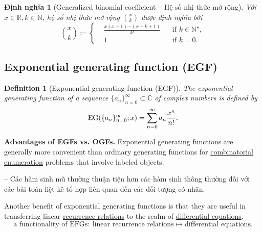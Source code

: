 \documentclass[oneside]{book}
\newtheorem{definition}{Definition}
\newtheorem{dinhnghia}{Định nghĩa}
\begin{document}
\begin{dinhnghia}[Generalized binomial coefficient -- Hệ số nhị thức mở rộng]
	Với $x\in\mathbb{R},k\in\mathbb{N}$, {\rm hệ số nhị thức mở rộng} $\binom{x}{k}$ được định nghĩa bởi
	\begin{equation*}
		\binom{x}{k}\coloneqq\left\{\begin{split}
			&\frac{x(x - 1)\cdots(x - k + 1)}{k!}&&\mbox{if } k\in\mathbb{N}^\star,\\
			&1&&\mbox{if } k = 0.
		\end{split}\right.
	\end{equation*}	
\end{dinhnghia}


\subsection{Exponential generating function (EGF)}

\begin{definition}[Exponential generating function (EGF)]
	The {\rm exponential generating function} of a sequence $\{a_n\}_{n=0}^\infty\subset\mathbb{C}$ of complex numbers is defined by
	\begin{equation*}
		{\rm EG}(\{a_n\}_{n=0}^\infty;x) = \sum_{n=0}^\infty a_n\frac{x^n}{n!}.
	\end{equation*}	
\end{definition}
\noindent\textsf{{\bf Advantages of EGFs vs. OGFs.}} Exponential generating functions are generally more convenient than ordinary generating functions for \href{https://en.wikipedia.org/wiki/Combinatorial_enumeration}{combinatorial enumeration} problems that involve labeled objects.

-- Các hàm sinh mũ thường thuận tiện hơn các hàm sinh thông thường đối với các bài toán liệt kê tổ hợp liên quan đến các đối tượng có nhãn.

Another benefit of exponential generating functions is that they are useful in transferring linear \href{https://en.wikipedia.org/wiki/Recurrence_relations}{recurrence relations} to the realm of \href{https://en.wikipedia.org/wiki/Differential_equations}{differential equations}.
\begin{equation*}
	\boxed{\mbox{a functionality of EFGs}:\ \mbox{linear recurrence relations}\mapsto\mbox{differential equations}.}
\end{equation*}
\end{document}
